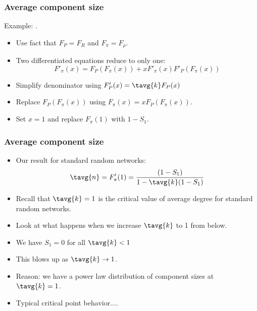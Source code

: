 \begin{frame}[label=]
  \frametitle{Average component size}

    \alert{Example}: .
    \begin{itemize}
    \item<2->
      Use fact that $F_P=F_R$ and $F_\pi=F_\rho$.
    \item<3->
      Two differentiated equations reduce to only one:
    $$
    F'_{\pi}(x)
    =
    F_{P}
    \left(
      F_{\pi} (x)
    \right)
    +
    x
    F'_{\pi} (x)
    F'_{P}
    \left(
      F_{\pi} (x)
    \right)
    $$
    \item<5->
      Simplify denominator using $F'_P(x) = \tavg{k} F_P(x)$
    \item<6->
      Replace $F_P(F_\pi(x))$ using $F_\pi(x) = x F_P(F_\pi(x))$.
    \item<7->
      Set $x=1$ and replace $F_\pi(1)$ with $1-S_1$.
    \end{itemize}
    
\end{frame}
  
\begin{frame}[label=]
  \frametitle{Average component size}

  \begin{itemize}
  \item<1->
    Our result for standard random networks:
    $$
    \tavg{n} 
    = 
    F'_{\pi}(1)
    =
    \frac{
      \left(
        1-S_1
      \right)
    }
    {
      1 -
      \tavg{k}(1-S_1)
    }
    $$
  \item<2->
    Recall that $\tavg{k}=1$ is the critical value 
    of average degree for standard random networks.
  \item<3->
    Look at what happens when we increase $\tavg{k}$ 
    to 1 from below.
  \item<4->
    We have $S_1=0$ for all $\tavg{k}<1$ 
  \item<5->
    This blows up as $\tavg{k} \rightarrow 1$.
  \item<6-> 
    \alert{Reason:} we have a power law distribution of component
    sizes at $\tavg{k}=1$.
  \item<7->
    Typical critical point behavior....
  \end{itemize}
\end{frame}

